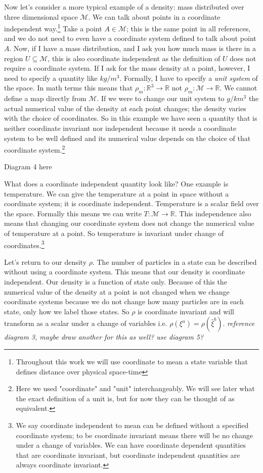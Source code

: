 \documentclass{article}
\begin{document}
	Now let's consider a more typical example of a density: mass distributed over three dimensional space $\mathcal{M}$. We can talk about points in a coordinate independent way.\footnote{Throughout this work we will use coordinate to mean a state variable that defines distance over physical space-time} Take a point $A \in \mathcal{M}$; this is the same point in all references, and we do not need to even have a coordinate system defined to talk about point $A$. Now, if I have a mass distribution, and I ask you how much mass is there in a region $U \subseteq \mathcal{M}$, this is also coordinate independent as the definition of $U$ does not require a coordinate system. If I ask for the mass density at a point, however, I need to specify a quantity like $kg/m^3$. Formally, I have to specify a \textit{unit system} of the space. In math terms this means that $\rho_m : \mathbb{R}^3 \to \mathbb{R}$ not $\rho_m : \mathcal{M} \to \mathbb{R}$. We cannot define a map directly from $\mathcal{M}$. If we were to change our unit system to $g/km^3$ the actual numerical value of the density at each point changes; the density varies with the choice of coordinates. So in this example we have seen a quantity that is neither coordinate invariant nor independent because it needs a coordinate system to be well defined and its numerical value depends on the choice of that coordinate system.\footnote{Here we used "coordinate" and "unit" interchangeably. We will see later what the exact definition of a unit is, but for now they can be thought of as equivalent.}
	
Diagram 4 here
	
	What does a coordinate independent quantity look like? One example is temperature. We can give the temperature at a point in space without a coordinate system; it is coordinate independent. Temperature is a scalar field over the space. Formally this means we can write $T : \mathcal{M} \to \mathbb{R}$. This independence also means that changing our coordinate system does not change the numerical value of temperature at a point. So temperature is invariant under change of coordinates.\footnote{We say coordinate independent to mean can be defined without a specified coordinate system; to be coordinate invariant means there will be no change under a change of variables. We can have coordinate dependent quantities that are coordinate invariant, but coordinate independent quantities are always coordinate invariant.}
	
	Let's return to our density $\rho$. The number of particles in a state can be described without using a coordinate system. This means that our density is coordinate independent. Our density is a function of state only. Because of this the numerical value of the density at a point is not changed when we change coordinate systems because we do not change how many particles are in each state, only how we label those states. So $\rho$ is coordinate invariant and will transform as a scalar under a change of variables i.e. $\rho(\xi^a) = \rho(\hat{\xi}^b)$. \emph{reference diagram 3, maybe draw another for this as well? use diagram 5?}
\end{document}
